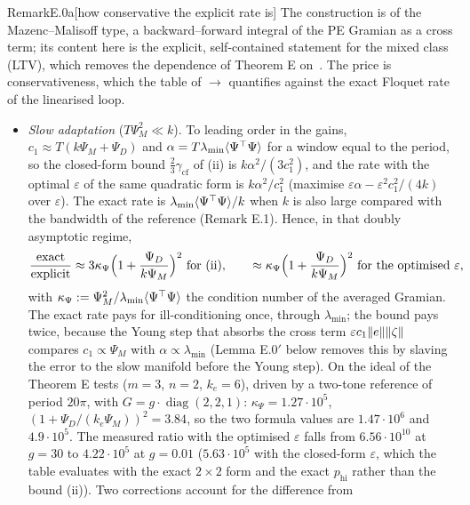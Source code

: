 \begin{rmk}{Remark}{E.0a}[how conservative the explicit rate is]
The construction is of the Mazenc--Malisoff type, a backward--forward integral of the PE Gramian as a cross term; its
content here is the explicit, self-contained statement for the mixed class (LTV), which removes the dependence of
Theorem E on~\cite{S8}. The price is conservativeness, which the table of  $\to$
 quantifies against the exact Floquet rate of the linearised loop.
\begin{itemize}
  \item \emph{Slow adaptation} ($T\Psi_M^2\ll k$). To leading order in the gains, $c_1\approx T(k\Psi_M+\Psi_D)$ and
    $\alpha=T\lambda_{\min}\langle\Psi^\top\Psi\rangle$ for a window equal to the period, so the closed-form bound
    $\frac23\gamma_{\mathrm{cf}}$ of (ii) is $k\alpha^2/(3c_1^2)$, and the rate with the optimal $\varepsilon$ of the
    same quadratic form is $k\alpha^2/c_1^2$ (maximise $\varepsilon\alpha-\varepsilon^2c_1^2/(4k)$ over
    $\varepsilon$). The exact rate is $\lambda_{\min}\langle\Psi^\top\Psi\rangle/k$ when $k$ is also large compared with
    the bandwidth of the reference (Remark E.1). Hence, in that doubly asymptotic regime,
    \[
      \frac{\text{exact}}{\text{explicit}}\approx3\kappa_\Psi\Bigl(1+\frac{\Psi_D}{k\Psi_M}\Bigr)^2\ \text{for (ii)},
      \qquad
      \approx\kappa_\Psi\Bigl(1+\frac{\Psi_D}{k\Psi_M}\Bigr)^2\ \text{for the optimised }\varepsilon,
    \]
    with $\kappa_\Psi:=\Psi_M^2/\lambda_{\min}\langle\Psi^\top\Psi\rangle$ the condition number of the averaged
    Gramian. The exact rate pays for ill-conditioning once, through $\lambda_{\min}$; the bound pays twice, because
    the Young step that absorbs the cross term $\varepsilon c_1\lVert e\rVert\lVert \zeta\rVert$ compares $c_1\propto\Psi_M$ with
    $\alpha\propto\lambda_{\min}$ (Lemma E.0$'$ below removes this by slaving the error to the slow manifold before
    the Young step). On the ideal of the Theorem E tests ($m=3$, $n=2$, $k_e=6$), driven by a two-tone
    reference of period $20\pi$, with $G=g\cdot\operatorname{diag}(2,2,1)$: $\kappa_\Psi=1.27\cdot10^5$,
    $(1+\Psi_D/(k_e\Psi_M))^2=3.84$, so the two formula values are $1.47\cdot10^6$ and $4.9\cdot10^5$. The measured
    ratio with the optimised $\varepsilon$ falls from $6.56\cdot10^{10}$ at $g=30$ to $4.22\cdot10^5$ at $g=0.01$
    ($5.63\cdot10^5$ with the closed-form $\varepsilon$, which the table evaluates with the exact $2\times2$ form and
    the exact $p_{\mathrm{hi}}$ rather than the bound (ii)). Two corrections account for the difference from

\end{itemize}
\end{rmk}
